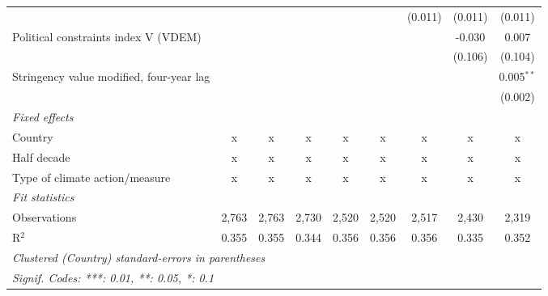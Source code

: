 \begin{tabular}{lcccccccc}
                                                 &               &               &               &               &               & (0.011)        & (0.011)       & (0.011)\\   
   Political constraints index V (VDEM)          &               &               &               &               &               &                & -0.030        & 0.007\\   
                                                 &               &               &               &               &               &                & (0.106)       & (0.104)\\   
   Stringency value modified, four-year lag      &               &               &               &               &               &                &               & 0.005$^{**}$\\   
                                                 &               &               &               &               &               &                &               & (0.002)\\   
   \emph{Fixed effects}\\
   Country                                       & x             & x             & x             & x             & x             & x              & x             & x\\  
   Half decade                                   & x             & x             & x             & x             & x             & x              & x             & x\\  
   Type of climate action/measure                & x             & x             & x             & x             & x             & x              & x             & x\\  
   \midrule \emph{Fit statistics}\\
   Observations                                  & 2,763         & 2,763         & 2,730         & 2,520         & 2,520         & 2,517          & 2,430         & 2,319\\  
   R$^2$                                         & 0.355         & 0.355         & 0.344         & 0.356         & 0.356         & 0.356          & 0.335         & 0.352\\  
   \midrule
   \multicolumn{9}{l}{\emph{Clustered (Country) standard-errors in parentheses}}\\
   \multicolumn{9}{l}{\emph{Signif. Codes: ***: 0.01, **: 0.05, *: 0.1}}\\
\end{tabular}
\par\endgroup


